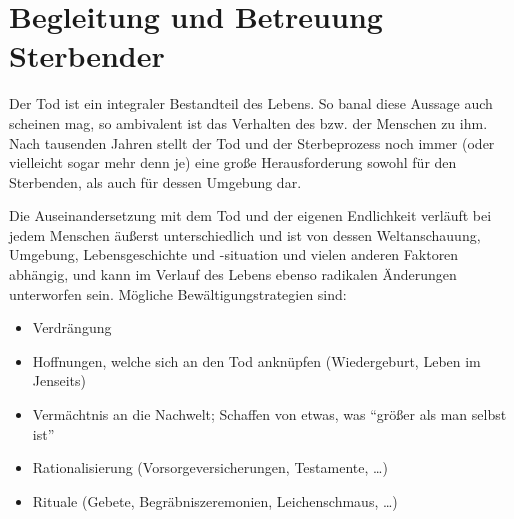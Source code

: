 % 



\section{Begleitung und Betreuung Sterbender}

\label{topic:sterbende-betreuung}



Der Tod ist ein integraler Bestandteil des Lebens. So banal
diese Aussage auch scheinen mag, so ambivalent ist das
Verhalten des bzw. der Menschen zu ihm. Nach tausenden
Jahren stellt der Tod und der Sterbeprozess noch immer
(oder vielleicht sogar mehr denn je) eine große
Herausforderung sowohl für den Sterbenden, als auch für
dessen Umgebung dar. 





Die Auseinandersetzung mit dem Tod und der eigenen
Endlichkeit verläuft bei jedem Menschen äußerst
unterschiedlich und ist von dessen Weltanschauung, Umgebung,
Lebensgeschichte und -situation und vielen anderen Faktoren
abhängig, und kann im Verlauf des Lebens ebenso radikalen
Änderungen unterworfen sein. Mögliche Bewältigungstrategien
sind:

\begin{itemize}
  \item Verdrängung
  \item Hoffnungen, welche sich an den Tod anknüpfen
  (Wiedergeburt, Leben im Jenseits)
  \item Vermächtnis an die Nachwelt; Schaffen von etwas, was
 \enquote{größer als man selbst ist}
  \item Rationalisierung (Vorsorgeversicherungen,
  Testamente, \ldots)
  \item Rituale (Gebete, Begräbniszeremonien,
  Leichenschmaus, \ldots)
\end{itemize}


